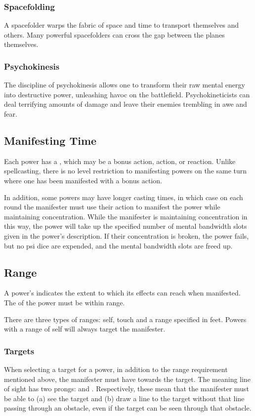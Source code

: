 \subsubsection{Spacefolding}
A spacefolder warps the fabric of space and time to
transport themselves and others.
Many powerful spacefolders can cross the gap between
the planes themselves.

\subsubsection{Psychokinesis}
The discipline of psychokinesis allows one to transform
their raw mental energy into destructive power,
unleashing havoc on the battlefield.
Psychokineticists can deal terrifying amounts of damage
and leave their enemies trembling in awe and fear.

\subsection{Manifesting Time}
Each power has a ,
which may be a bonus action, action, or reaction.
Unlike spellcasting,
there is no level restriction to manifesting powers
on the same turn where one has been manifested
with a bonus action. 

In addition, some powers may have longer casting times,
in which case on each round the manifester must use their action
to manifest the power while maintaining concentration.
While the manifester is maintaining concentration in this way,
the power will take up the specified number
of mental bandwidth slots given in the power's description.
If their concentration is broken, the power fails,
but no psi dice are expended,
and the mental bandwidth slots are freed up.

\subsection{Range}
A power's  indicates the extent
to which its effects can reach when manifested.
The  of the power must be within range.

There are three types of ranges: self, touch and a range
specified in feet.
Powers with a range of self will always target the manifester.

\subsubsection{Targets}
When selecting a target for a power,
in addition to the range requirement mentioned above,
the manifester must have 
towards the target.
The meaning line of sight has two prongs:
 and .
Respectively, these mean that the manifester must be able to
(a) see the target
and (b) draw a line to the target
without that line passing through an obstacle,
even if the target can be seen through that obstacle.

